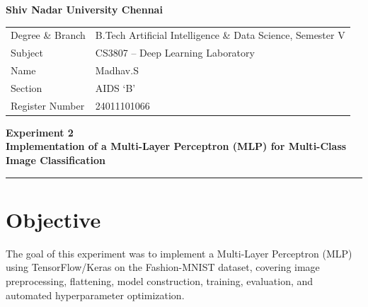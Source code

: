 \documentclass[11pt]{article}
\title{\vspace{-2cm}}
\date{}
\begin{document}
\begin{center}
    {\Large \textbf{Shiv Nadar University Chennai}}\\[4pt]
\end{center}

\noindent
\begin{tabular}{@{}p{4.2cm}l@{}}
    Degree \& Branch    & B.Tech Artificial Intelligence \& Data Science, Semester V \\
    Subject             & CS3807 -- Deep Learning Laboratory \\
    Name                & Madhav.S \\
    Section             & AIDS `B' \\
    Register Number     & 24011101066 \\
\end{tabular}

\vspace{0.6cm}
\begin{center}
    {\Large \textbf{Experiment 2}}\\[6pt]
    {\large \textbf{Implementation of a Multi-Layer Perceptron (MLP) for Multi-Class Image Classification}}
\end{center}

\vspace{0.4cm}
\hrule
\vspace{0.6cm}

\section{Objective}
The goal of this experiment was to implement a Multi-Layer Perceptron (MLP) using
TensorFlow/Keras on the Fashion-MNIST dataset, covering image preprocessing,
flattening, model construction, training, evaluation, and automated hyperparameter
optimization.

\end{document}
